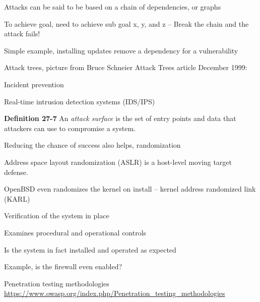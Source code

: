 \documentclass[Screen16to9,17pt]{foils}
\begin{document}


\begin{list2}
\item Attacks can be said to be based on a chain of dependencies, or graphs
\item To achieve goal, need to achieve sub goal x, y, and z -- Break the chain and the attack fails!
\item Simple example, installing updates remove a dependency for a vulnerability
\item Attack trees, picture from Bruce Schneier Attack Trees article December 1999:\\ {\footnotesize{}}
\end{list2}




\begin{list2}
\item Incident prevention
\item Real-time intrusion detection systems (IDS/IPS)
\item {\bf Definition 27-7} An \emph{attack surface} is the set of entry points and data that attackers can use to compromise a system.
\item Reducing the chance of success also helps, randomization
\item Address space layout randomization (ASLR) is a host-level moving target defense.
\item OpenBSD even randomizes the kernel on install -- kernel address randomized link (KARL)
\end{list2}









\begin{list1}
\item Verification of the system in place
\item Examines procedural and operational controls
\item Is the system in fact installed and operated as expected
\item Example, is the firewall even enabled?
\item Penetration testing methodologies\\
\url{https://www.owasp.org/index.php/Penetration_testing_methodologies}
\end{list1}
\end{document}
